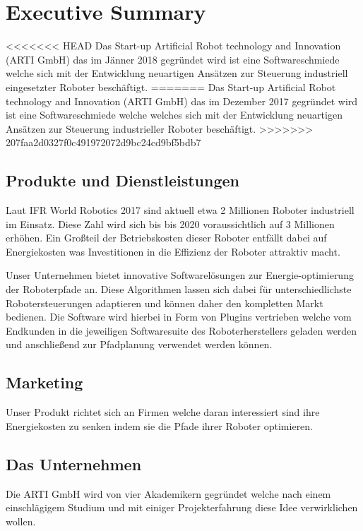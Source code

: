 \chapter{Executive Summary}

<<<<<<< HEAD
Das Start-up Artificial Robot technology and Innovation (ARTI GmbH) das im Jänner 2018 gegründet wird ist eine Softwareschmiede welche sich mit der Entwicklung neuartigen Ansätzen zur Steuerung industriell eingesetzter Roboter beschäftigt.
=======
Das Start-up Artificial Robot technology and Innovation (ARTI GmbH) das im Dezember 2017 gegründet wird ist eine Softwareschmiede welche welches sich mit der Entwicklung neuartigen Ansätzen zur Steuerung industrieller Roboter beschäftigt.
>>>>>>> 207faa2d0327f0c491972072d9bc24cd9bf5bdb7

\section{Produkte und Dienstleistungen}

Laut IFR World Robotics 2017 sind aktuell etwa 2 Millionen Roboter industriell im Einsatz. Diese Zahl wird sich bis bis 2020 voraussichtlich auf 3 Millionen erhöhen. Ein Großteil der Betriebskosten dieser Roboter entfällt dabei auf Energiekosten was Investitionen in die Effizienz der Roboter attraktiv macht.

Unser Unternehmen bietet innovative Softwarelösungen zur Energie-optimierung der Roboterpfade an. Diese Algorithmen lassen sich dabei für unterschiedlichste Robotersteuerungen adaptieren und können daher den kompletten Markt bedienen. Die Software wird hierbei in Form von Plugins vertrieben welche vom Endkunden in die jeweiligen Softwaresuite des Roboterherstellers geladen werden und anschließend zur Pfadplanung verwendet werden können.

\section{Marketing}

Unser Produkt richtet sich an Firmen welche daran interessiert sind ihre Energiekosten zu senken indem sie die Pfade ihrer Roboter optimieren.

\section{Das Unternehmen}

Die ARTI GmbH wird von vier Akademikern gegründet welche nach einem einschlägigem Studium und mit einiger Projekterfahrung diese Idee verwirklichen wollen.


